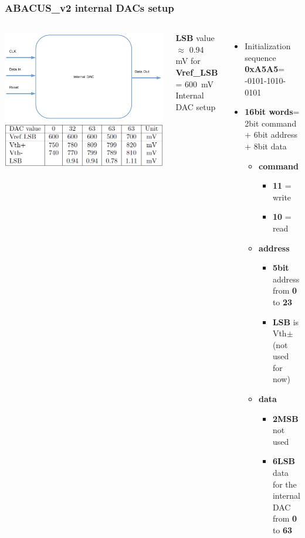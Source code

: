 \documentclass[aspectratio=169]{beamer}
\begin{document}
	\begin{frame}
		\frametitle{ABACUS\_v2 internal DACs setup}	
		\begin{columns}
			\begin{center}
				\includegraphics[width=0.7 \textwidth]{IMG/InternalDAC.pdf}
				\includegraphics[width=0.7 \textwidth]{IMG/TableLSB.PNG}
			\end{center}
			\textbf{LSB} value $\approx$ 0.94 mV for \textbf{Vref\_LSB} = 600~mV
			{\color{blue} Internal DAC setup}
			\begin{itemize}
				\item Initialization sequence \textbf{0xA5A5}= 
				-0101-1010-0101
				\item \textbf{16bit words}= \newline 2bit command + 6bit address + 8bit data
				\begin{itemize}
					\item \textbf{command}
					\begin{itemize}
						\item \textbf{11} = write
						\item \textbf{10} = read
					\end{itemize}
					\item \textbf{address}
					\begin{itemize}
						\item \textbf{5bit} address from \textbf{0} to \textbf{23}
						\item \textbf{LSB} is Vth$\pm$ (not used for now)
					\end{itemize}
					\item \textbf{data}
					\begin{itemize}
						\item \textbf{2MSB} not used
						\item \textbf{6LSB} data for the internal DAC \newline from \textbf{0} to \textbf{63}
					\end{itemize}
				\end{itemize} 
			\end{itemize}
		\end{columns}
	\end{frame}
\end{document}
